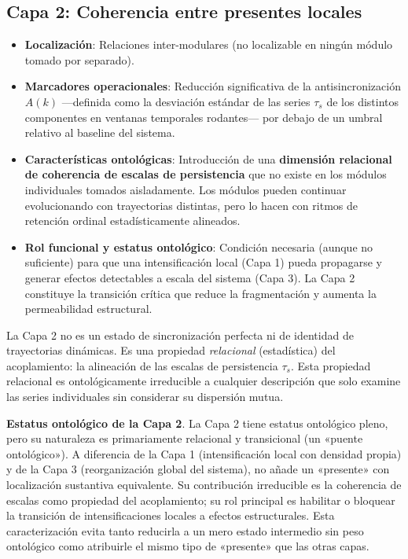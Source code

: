 \subsection{Capa 2: Coherencia entre presentes locales}

\begin{itemize}
    \item \textbf{Localización}: Relaciones inter-modulares (no localizable en ningún módulo tomado por separado).
    \item \textbf{Marcadores operacionales}: Reducción significativa de la antisincronización $A(k)$ —definida como la desviación estándar de las series $\tau_s$ de los distintos componentes en ventanas temporales rodantes— por debajo de un umbral relativo al baseline del sistema.
    \item \textbf{Características ontológicas}: Introducción de una \textbf{dimensión relacional de coherencia de escalas de persistencia} que no existe en los módulos individuales tomados aisladamente. Los módulos pueden continuar evolucionando con trayectorias distintas, pero lo hacen con ritmos de retención ordinal estadísticamente alineados.
    \item \textbf{Rol funcional y estatus ontológico}: Condición necesaria (aunque no suficiente) para que una intensificación local (Capa 1) pueda propagarse y generar efectos detectables a escala del sistema (Capa 3). La Capa 2 constituye la transición crítica que reduce la fragmentación y aumenta la permeabilidad estructural.
\end{itemize}

La Capa 2 no es un estado de sincronización perfecta ni de identidad de trayectorias dinámicas. Es una propiedad \textit{relacional} (estadística) del acoplamiento: la alineación de las escalas de persistencia $\tau_s$. Esta propiedad relacional es ontológicamente irreducible a cualquier descripción que solo examine las series individuales sin considerar su dispersión mutua.

\textbf{Estatus ontológico de la Capa 2}. La Capa 2 tiene estatus ontológico pleno, pero su naturaleza es primariamente relacional y transicional (un «puente ontológico»). A diferencia de la Capa 1 (intensificación local con densidad propia) y de la Capa 3 (reorganización global del sistema), no añade un «presente» con localización sustantiva equivalente. Su contribución irreducible es la coherencia de escalas como propiedad del acoplamiento; su rol principal es habilitar o bloquear la transición de intensificaciones locales a efectos estructurales. Esta caracterización evita tanto reducirla a un mero estado intermedio sin peso ontológico como atribuirle el mismo tipo de «presente» que las otras capas.

